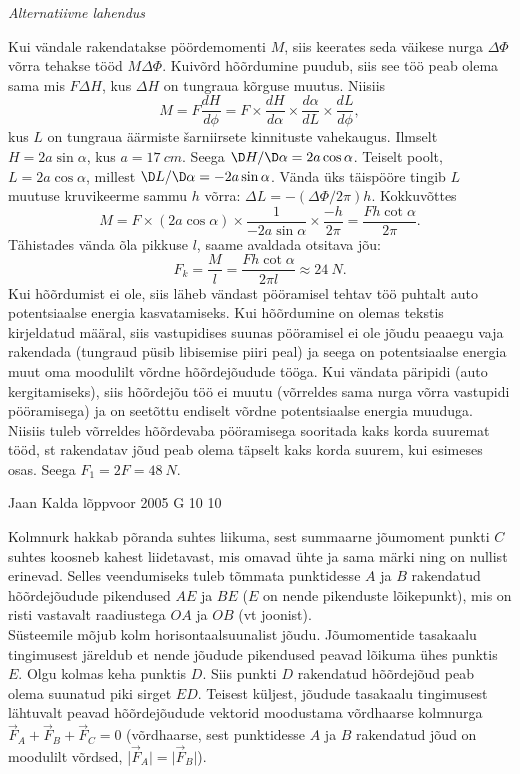 \documentclass[11pt]{article}
\begin{document}
{{\vspace{0.5\baselineskip}

\emph{Alternatiivne lahendus}

Kui vändale rakendatakse pöördemomenti $M$, siis keerates seda
väikese nurga $\Delta\Phi$ võrra tehakse tööd $M\Delta\Phi$. Kuivõrd hõõrdumine puudub, siis see
töö peab olema sama mis $F\Delta H$, kus $\Delta H$ on tungraua kõrguse muutus. Niisiis
\[
M=F \frac{d H}{d \phi}=F \times \frac{d H}{d \alpha} \times \frac{d \alpha}{d L} \times \frac{d L}{d \phi},
\]
kus $L$ on tungraua äärmiste šarniirsete kinnituste vahekaugus. Ilmselt $H = 2a \sin\alpha$,
kus $a = \SI{17}{cm}$. Seega $\D H/\D\alpha = 2a \cos\alpha$. Teiselt poolt, $L = 2a \cos\alpha$, millest $\D L/\D\alpha =
-2a \sin\alpha$. Vända üks täispööre tingib $L$ muutuse kruvikeerme sammu $h$ võrra: $\Delta L =
-(\Delta\Phi/2\pi)h$. Kokkuvõttes
\[
M=F \times(2 a \cos \alpha) \times \frac{1}{-2 a \sin \alpha} \times \frac{-h}{2 \pi}=\frac{F h \cot \alpha}{2 \pi}.
\]
Tähistades vända õla pikkuse $l$, saame avaldada otsitava jõu:
\[
F_{k}=\frac{M}{l}=\frac{F h \cot \alpha}{2 \pi l} \approx \SI{24}{N}.
\]
\osa Kui hõõrdumist ei ole, siis läheb vändast pööramisel tehtav töö puhtalt auto
potentsiaalse energia kasvatamiseks. Kui hõõrdumine on olemas tekstis kirjeldatud
määral, siis vastupidises suunas pööramisel ei ole jõudu peaaegu vaja rakendada
(tungraud püsib libisemise piiri peal) ja seega on potentsiaalse energia muut oma
moodulilt võrdne hõõrdejõudude tööga. Kui vändata päripidi (auto kergitamiseks),
siis hõõrdejõu töö ei muutu (võrreldes sama nurga võrra vastupidi pööramisega) ja
on seetõttu endiselt võrdne potentsiaalse energia muuduga. Niisiis tuleb võrreldes
hõõrdevaba pööramisega sooritada kaks korda suuremat tööd, st rakendatav jõud
peab olema täpselt kaks korda suurem, kui esimeses osas. Seega $F_1 = 2F = \SI{48}{N}$.
\fi
}

{Jaan Kalda} %
{lõppvoor} %
{2005} %
{G 10} %
{10} %
{

\ifSolution
\osa Kolmnurk hakkab põranda suhtes liikuma, sest summaarne jõumoment punkti $C$ suhtes koosneb kahest liidetavast, mis omavad ühte ja sama märki ning on nullist erinevad. Selles veendumiseks tuleb tõmmata punktidesse $A$ ja $B$ rakendatud hõõrdejõudude pikendused $AE$ ja $BE$ ($E$ on nende pikenduste lõikepunkt), mis on risti vastavalt raadiustega $OA$ ja $OB$ (vt joonist).\\
\osa Süsteemile mõjub kolm horisontaalsuunalist jõudu. Jõumomentide tasakaalu tingimusest järeldub et nende jõudude pikendused peavad lõikuma ühes punktis $E$. Olgu kolmas keha punktis $D$. Siis punkti $D$ rakendatud hõõrdejõud peab olema suunatud piki sirget $ED$. Teisest küljest, jõudude tasakaalu tingimusest lähtuvalt peavad hõõrdejõudude vektorid moodustama võrdhaarse kolmnurga $\vec F_A+\vec F_B+\vec F_C = 0$ (võrdhaarse, sest punktidesse $A$ ja $B$ rakendatud jõud on moodulilt võrdsed, |$\vec F_A| = |\vec F_B|$).

}}
\end{document}
